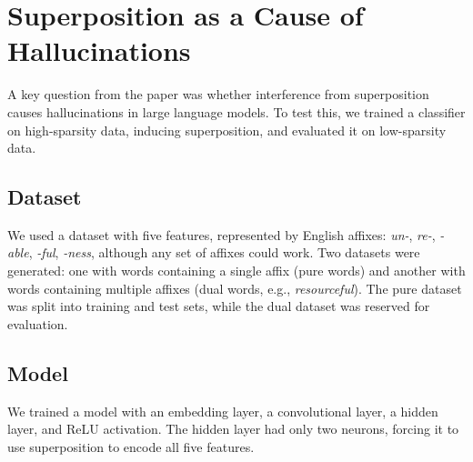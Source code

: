 \section{Superposition as a Cause of Hallucinations}
\label{sec:superposition_as_a_cause_of_hallucinations}

A key question from the paper was whether interference from superposition causes hallucinations in large language models.
To test this, we trained a classifier on high-sparsity data, inducing superposition, and evaluated it on low-sparsity data.

\subsection{Dataset}
We used a dataset with five features, represented by English affixes: \textit{un-}, \textit{re-}, \textit{-able}, \textit{-ful}, \textit{-ness}, although any set of affixes could work.
Two datasets were generated: one with words containing a single affix (pure words) and another with words containing multiple affixes (dual words, e.g., \textit{resourceful}).
The pure dataset was split into training and test sets, while the dual dataset was reserved for evaluation.

\subsection{Model}
We trained a model with an embedding layer, a convolutional layer, a hidden layer, and ReLU activation.
The hidden layer had only two neurons, forcing it to use superposition to encode all five features.


